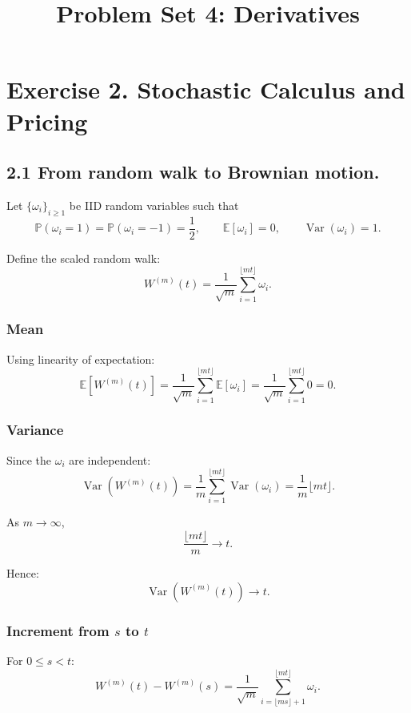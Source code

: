 \documentclass[11pt]{article}
\begin{document}
\title{Problem Set 4: Derivatives}
\author{}
\date{}
\maketitle

\section*{Exercise 2. Stochastic Calculus and Pricing}
\subsection*{2.1 From random walk to Brownian motion.}

Let $\{\omega_i\}_{i\geq1}$ be IID random variables such that
\[
\mathbb P(\omega_i=1)=\mathbb P(\omega_i=-1)=\frac12,
\qquad
\mathbb E[\omega_i]=0,
\qquad
\operatorname{Var}(\omega_i)=1.
\]

Define the scaled random walk:
\[
W^{(m)}(t)=\frac{1}{\sqrt m}\sum_{i=1}^{\lfloor mt\rfloor}\omega_i.
\]

\subsubsection*{Mean}

Using linearity of expectation:
\[
\mathbb E[W^{(m)}(t)]
=
\frac{1}{\sqrt m}\sum_{i=1}^{\lfloor mt\rfloor}\mathbb E[\omega_i]
=
\frac{1}{\sqrt m}\sum_{i=1}^{\lfloor mt\rfloor}0=0.
\]

\subsubsection*{Variance}

Since the $\omega_i$ are independent:
\[
\operatorname{Var}\!\left(W^{(m)}(t)\right)
=
\frac{1}{m}\sum_{i=1}^{\lfloor mt\rfloor}\operatorname{Var}(\omega_i)
=
\frac{1}{m}\lfloor mt\rfloor.
\]

As $m\to\infty$,
\[
\frac{\lfloor mt\rfloor}{m}\to t.
\]

Hence:
\[
\operatorname{Var}(W^{(m)}(t))\to t.
\]

\subsubsection*{Increment from $s$ to $t$}

For $0\le s<t$:
\[
W^{(m)}(t)-W^{(m)}(s)
=
\frac{1}{\sqrt m}\sum_{i=\lfloor ms\rfloor+1}^{\lfloor mt\rfloor}\omega_i.
\]
\end{document}
